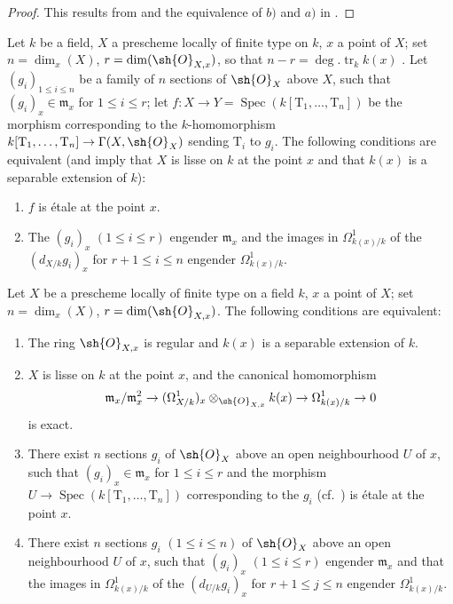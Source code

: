\begin{proof}
This results from  and the equivalence of $b)$ and $a)$ in .
\end{proof}

\begin{proposition}[17.15.8]
\label{IV.17.15.8}
Let $k$ be a field, $X$ a prescheme locally of finite type on $k$, $x$ a point of $X$; set $n=\dim_x(X)$, $r=\dim(\sh{O}_{X,x})$, so that $n-r=\deg.\operatorname{tr}_k k(x)$ .
Let $(g_i)_{1\leq i\leq n}$ be a family of $n$ sections of $\sh{O}_X$ above $X$, such that $(g_i)_x\in\mathfrak{m}_x$ for $1\leq i\leq r$; let $f:X\to Y=\operatorname{Spec}(k[\mathrm{T}_1,\ldots,\mathrm{T}_n])$ be the morphism corresponding to the $k$-homomorphism $k[\mathrm{T}_1,\ldots,\mathrm{T}_n]\to\Gamma(X,\sh{O}_X)$ sending $\mathrm{T}_i$ to $g_i$.
The following conditions are equivalent (and imply that $X$ is lisse on $k$ at the point $x$ and that $k(x)$ is a separable extension of $k$):
\begin{enumerate}
  \item[a)] $f$ is \'etale at the point $x$.
  \item[b)] The $(g_i)_x$ $(1\leq i\leq r)$ engender $\mathfrak{m}_x$ and the images in $\Omega^1_{k(x)/k}$ of the $(d_{X/k} g_i)_x$ for $r+1\leq i\leq n$ engender $\Omega^1_{k(x)/k}$.
\end{enumerate}
\end{proposition}

\begin{corollary}[17.15.9]
\label{IV.17.15.9}
Let $X$ be a prescheme locally of finite type on a field $k$, $x$ a point of $X$; set $n=\dim_x(X)$, $r=\dim(\sh{O}_{X,x})$.
The following conditions are equivalent:
\begin{enumerate}
  \item[a)] The ring $\sh{O}_{X,x}$ is regular and $k(x)$ is a separable extension of $k$.
  \item[b)] $X$ is lisse on $k$ at the point $x$, and the canonical homomorphism
\[
\mathfrak{m}_x/\mathfrak{m}_x^2 \to (\Omega^1_{X/k})_x\otimes_{\sh{O}_{X,x}} k(x) \to \Omega^1_{k(x)/k} \to 0
\]
is exact.
  \item[c)] There exist $n$ sections $g_i$ of $\sh{O}_X$ above an open neighbourhood $U$ of $x$, such that $(g_i)_x\in\mathfrak{m}_x$ for $1\leq i\leq r$ and the morphism $U\to\operatorname{Spec}(k[\mathrm{T}_1,\ldots,\mathrm{T}_n])$ corresponding to the $g_i$ (cf.\ ) is \'etale at the point $x$.
  \item[d)] There exist $n$ sections $g_i$ $(1\leq i\leq n)$ of $\sh{O}_X$ above an open neighbourhood $U$ of $x$, such that $(g_i)_x$ $(1\leq i\leq r)$ engender $\mathfrak{m}_x$ and that the images in $\Omega^1_{k(x)/k}$ of the $(d_{U/k} g_i)_x$ for $r+1\leq j\leq n$ engender $\Omega^1_{k(x)/k}$.
\end{enumerate}
\end{corollary}

